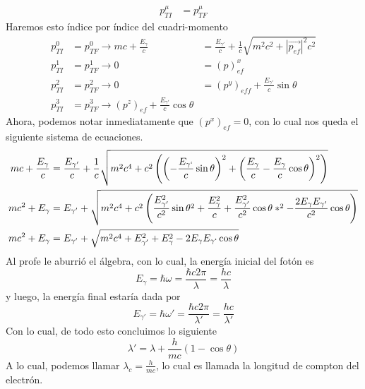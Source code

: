 \documentclass[../main.tex]{subfiles}
\begin{document}
\begin{align*}
  p_{TI}^\mu  & = p^\mu_{TF} 
\end{align*}
Haremos esto índice por índice del cuadri-momento 
\begin{align*}
  p_{TI}^0  & = p_{TF}^0 \rightarrow mc + \frac{E_\gamma}{c} & = \frac{E_{\gamma '}}{c} + \frac{1}{c}\sqrt{m^2c^2 + |\vec{p_{ef}}|^2c^2} \\
  p_{TI}^1 & = p_{TF}^1 \rightarrow 0  & = (p)^x_{ef} \\
  p_{TI}^2 & = p_{TF}^2 \rightarrow 0 & = (p^y)_{eff} + \frac{E_{\gamma '}}{c}\sin{\theta} \\
  p_{TI}^3 & = p_{TF}^3 \rightarrow (p^z)_{ef} + \frac{E_{\gamma '}}{c}\cos{\theta}
\end{align*}
Ahora, podemos notar inmediatamente que $(p^x)_{ef}=0$, con lo cual nos queda el siguiente sistema de ecuaciones.
\begin{align*}
  mc + \frac{E_{\gamma}}{c}  & = \frac{E_{\gamma '}}{c} + \frac{1}{c}\sqrt{m^2c^4 + c^2\left(\left(-\frac{E_{\gamma `}}{c}\sin{\theta}\right)^2 + \left( \frac{E_{\gamma}}{c} - \frac{E_\gamma}{c}\cos{\theta} \right)^2\right)} \\
  mc^2 + E_\gamma & = E_{\gamma '} + \sqrt{m^2c^4 + c^2\left( \frac{E_{\gamma '}^2}{c^2}\sin{\theta}^2 + \frac{E_{\gamma}^2}{c} + \frac{E_{\gamma '}^2}{c^2}\cos{\theta}* ^2 - \frac{2E_{\gamma}E_{\gamma '}}{c^2}\cos{\theta}\right)} \\
  mc^2 + E_\gamma & = E_{\gamma '} + \sqrt{m^2c^4 + E^2_{\gamma '} + E^2_\gamma - 2E_\gamma E_{\gamma `}\cos{\theta}}
\end{align*}
Al profe le aburrió el álgebra, con lo cual, la energía inicial del fotón es
\begin{equation*}
E_\gamma=\hbar\omega = \frac{\hbar c2\pi}{\lambda} = \frac{hc}{\lambda}  
\end{equation*}
y luego, la energía final estaría dada por 
\begin{equation*}
  E_{\gamma '} = \hbar \omega ' = \frac{\hbar c 2\pi}{\lambda '} = \frac{hc}{\lambda ' }
\end{equation*}
Con lo cual, de todo esto concluimos lo siguiente 
\begin{equation}
  \lambda ' = \lambda + \frac{h}{mc}(1-\cos{\theta})
\end{equation}
A lo cual, podemos llamar $\lambda_c=\frac{h}{mc}$, lo cual es llamada la longitud de compton del electrón. 
\end{document}
